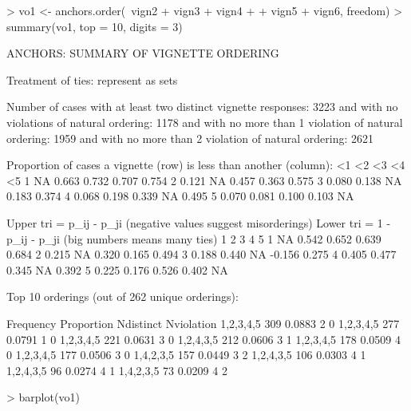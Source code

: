 \documentclass{amsart}
\begin{document}
\begin{Schunk}
\begin{Sinput}
> vo1 <- anchors.order(~vign2 + vign3 + vign4 + 
+     vign5 + vign6, freedom)
> summary(vo1, top = 10, digits = 3)
\end{Sinput}
\begin{Soutput}
ANCHORS: SUMMARY OF VIGNETTE ORDERING

Treatment of ties: represent as sets 

Number of cases with at least two distinct vignette responses: 3223 
and with no violations of natural ordering: 1178 
and with no more than 1 violation of natural ordering: 1959 
and with no more than 2 violation of natural ordering: 2621 

Proportion of cases a vignette (row) is less than another (column):
     <1    <2    <3    <4    <5
1    NA 0.663 0.732 0.707 0.754
2 0.121    NA 0.457 0.363 0.575
3 0.080 0.138    NA 0.183 0.374
4 0.068 0.198 0.339    NA 0.495
5 0.070 0.081 0.100 0.103    NA

Upper tri =     p_{ij} - p_{ji} (negative values suggest misorderings)
Lower tri = 1 - p_{ij} - p_{ji} (big numbers means many ties)
      1     2     3      4     5
1    NA 0.542 0.652  0.639 0.684
2 0.215    NA 0.320  0.165 0.494
3 0.188 0.440    NA -0.156 0.275
4 0.405 0.477 0.345     NA 0.392
5 0.225 0.176 0.526  0.402    NA

Top 10 orderings (out of 262 unique orderings):

              Frequency Proportion Ndistinct Nviolation
1,{2,3,4,5}         309     0.0883         2          0
{1,2,3,4,5}         277     0.0791         1          0
1,2,{3,4,5}         221     0.0631         3          0
1,{2,4},{3,5}       212     0.0606         3          1
1,2,{3,4},5         178     0.0509         4          0
1,{2,3,4},5         177     0.0506         3          0
1,4,{2,3,5}         157     0.0449         3          2
1,2,4,{3,5}         106     0.0303         4          1
1,{2,4},3,5          96     0.0274         4          1
1,4,2,{3,5}          73     0.0209         4          2
\end{Soutput}
\begin{Sinput}
> barplot(vo1)
\end{Sinput}
\end{Schunk}
\end{document}
